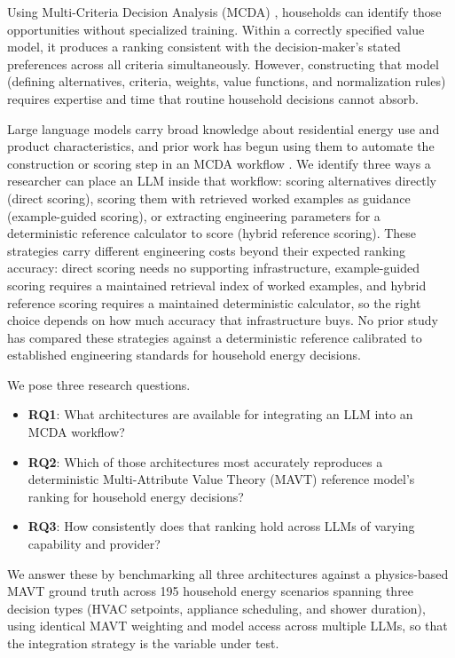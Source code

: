 \documentclass[final,3p,times]{elsarticle}
\begin{document}
Using Multi-Criteria Decision Analysis (MCDA) \cite{huang2011}, households can identify those opportunities without specialized training. Within a correctly specified value model, it produces a ranking consistent with the decision-maker's stated preferences across all criteria simultaneously. However, constructing that model (defining alternatives, criteria, weights, value functions, and normalization rules) requires expertise and time that routine household decisions cannot absorb.

Large language models carry broad knowledge about residential energy use and product characteristics, and prior work has begun using them to automate the construction or scoring step in an MCDA workflow \cite{svoboda2024,icaart26}. We identify three ways a researcher can place an LLM inside that workflow: scoring alternatives directly (direct scoring), scoring them with retrieved worked examples as guidance (example-guided scoring), or extracting engineering parameters for a deterministic reference calculator to score (hybrid reference scoring). These strategies carry different engineering costs beyond their expected ranking accuracy: direct scoring needs no supporting infrastructure, example-guided scoring requires a maintained retrieval index of worked examples, and hybrid reference scoring requires a maintained deterministic calculator, so the right choice depends on how much accuracy that infrastructure buys. No prior study has compared these strategies against a deterministic reference calibrated to established engineering standards for household energy decisions.

We pose three research questions.
\begin{itemize}
\item \textbf{RQ1}: What architectures are available for integrating an LLM into an MCDA workflow?
\item \textbf{RQ2}: Which of those architectures most accurately reproduces a deterministic Multi-Attribute Value Theory (MAVT) reference model's ranking for household energy decisions?
\item \textbf{RQ3}: How consistently does that ranking hold across LLMs of varying capability and provider?
\end{itemize}
We answer these by benchmarking all three architectures against a physics-based MAVT ground truth across 195 household energy scenarios spanning three decision types (HVAC setpoints, appliance scheduling, and shower duration), using identical MAVT weighting and model access across multiple LLMs, so that the integration strategy is the variable under test.
\end{document}

